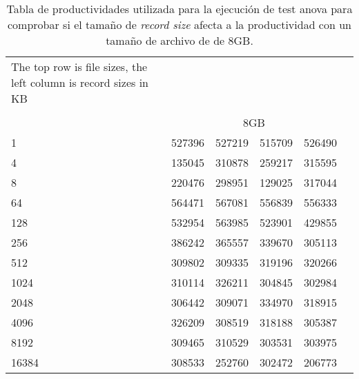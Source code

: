 \begin{table}[!htp]\centering
\caption{Tabla de productividades utilizada para la ejecución de test anova para comprobar si el tamaño de \textit{record size} afecta a la productividad con un tamaño de archivo de de 8GB.}
\scriptsize
\begin{tabular}{lrrrrr}\toprule
The top row is file sizes, the left column is record sizes in KB & & & & \\
& & & & \\
&\multicolumn{4}{c}{8GB} \\\midrule
1 &527396 &527219 &515709 &526490 \\
4 &135045 &310878 &259217 &315595 \\
8 &220476 &298951 &129025 &317044 \\
64 &564471 &567081 &556839 &556333 \\
128 &532954 &563985 &523901 &429855 \\
256 &386242 &365557 &339670 &305113 \\
512 &309802 &309335 &319196 &320266 \\
1024 &310114 &326211 &304845 &302984 \\
2048 &306442 &309071 &334970 &318915 \\
4096 &326209 &308519 &318188 &305387 \\
8192 &309465 &310529 &303531 &303975 \\
16384 &308533 &252760 &302472 &206773 \\
\bottomrule
\end{tabular}
\end{table}


